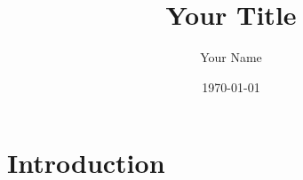 \documentclass{article}
\title{Your Title}
\author{Your Name}
\date{\today}
\begin{document}
\maketitle

\section{Introduction}
\end{document}
